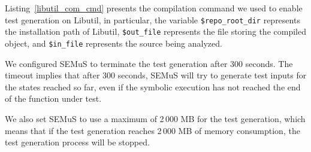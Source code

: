 Listing~\ref{libutil_com_cmd} presents the compilation command we used to enable test generation on Libutil, in particular, the variable \texttt{\$repo\_root\_dir} represents the installation path of Libutil, \texttt{\$out\_file} represents the file storing the compiled object, and \texttt{\$in\_file} represents the source being analyzed.


We configured SEMuS to terminate the test generation after 300 seconds. The timeout implies that after 300 seconds, SEMuS will try to generate test inputs for the states reached so far, even if the symbolic execution has not reached the end of the function under test.


We also set SEMuS to use a maximum of 2\,000 MB for the test generation, which means that if the test generation reaches 2\,000 MB of memory consumption, the test generation process will be stopped.


